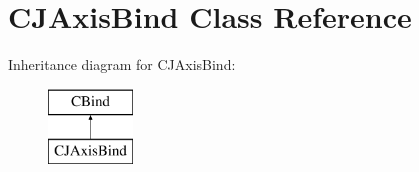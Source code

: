\hypertarget{classCJAxisBind}{\section{C\-J\-Axis\-Bind Class Reference}
\label{classCJAxisBind}
}
Inheritance diagram for C\-J\-Axis\-Bind\-:\begin{figure}[H]
\begin{center}
\leavevmode
\includegraphics[height=2.000000cm]{classCJAxisBind}
\end{center}
\end{figure}
